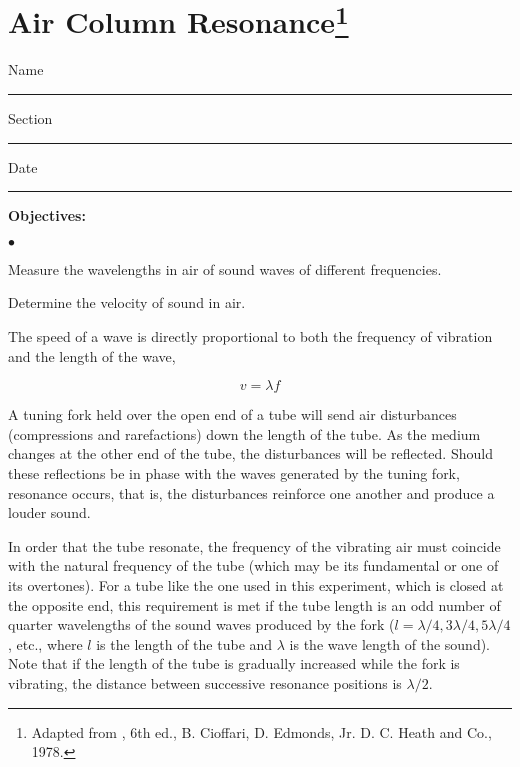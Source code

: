 
\section{Air Column Resonance\footnote{
Adapted from , 6th ed., B. Cioffari, D. Edmonds,
Jr. D. C. Heath and Co., 1978.
}}

Name \rule{2.0in}{0.1pt}\hfill{}Section \rule{1.0in}{0.1pt}\hfill{}Date \rule{1.0in}{0.1pt}



{\noindent \bf Objectives:} \begin{list}{$\bullet$}{\itemsep0pt }

\item Measure the wavelengths in air of sound waves of different frequencies.

\item Determine the velocity of sound in air.

\end{list}


The speed
of a wave is directly proportional to both the frequency of vibration and the length of the wave,

\begin{equation} v = \lambda f \end{equation}

\noindent A tuning fork held over the open end of a tube will send air disturbances (compressions and rarefactions) down the length of the tube. As the medium changes at the other end of the tube, the disturbances will be reflected. Should these reflections be in phase with the waves generated by the tuning fork, resonance occurs, that is, the disturbances reinforce one another and produce a louder sound.

\noindent In order that the tube resonate, the frequency of the vibrating air must coincide with the natural frequency of the tube (which may be its fundamental or one of its overtones). For a tube like the one used in this experiment, which is closed at the opposite end, this requirement is met if the tube length is an odd number of quarter wavelengths of the sound waves produced by the fork ($l = \lambda/4, 3 \lambda/4, 5 \lambda/4$, etc., where $l$ is the length of the tube and $\lambda$ is the wave length of the sound). Note that if the length of the tube is gradually increased while the fork is vibrating, the distance between successive resonance positions is $\lambda/2$. \\

